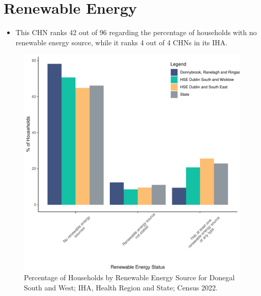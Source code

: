 \documentclass{article}
\begin{document}
\section{Renewable Energy}\label{sect:RE}
\begin{itemize}
\item This CHN ranks  42 out of 96 regarding the percentage of households with no renewable energy source, while it ranks   4 out of 4 CHNs in its IHA.
\end{itemize}
\begin{figure}[H]
	\centering
	\includegraphics[width = 140mm]{../figures/RenewableEnergyED.pdf}
	\caption{Percentage of Households by Renewable Energy Source for Donegal South and West; IHA, Health Region and State; Census 2022.}
	\label{fig:vbnv}
	\end{figure}
\end{document}
